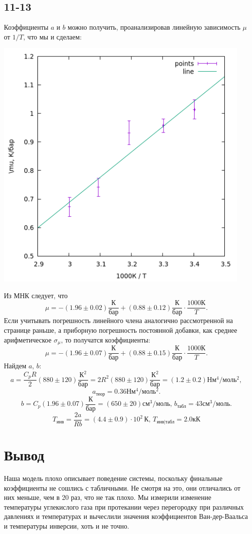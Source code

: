 \subsection*{11-13}
Коэффициенты $a$ и $b$ можно получить, проанализировав линейную зависимость $\mu$ от $1/T$, что мы и сделаем:
\begin{center}
\includegraphics[width=0.95\textwidth]{plot0.png}
\end{center}
Из МНК следует, что
$$\mu = -(1.96\pm0.02)\frac{\text{К}}{\text{бар}} + (0.88\pm0.12)\frac{\text{К}}{\text{бар}}\cdot\frac{1000\text{К}}{T}.$$
Если учитывать погрешность линейного члена аналогично рассмотренной на странице раньше, а приборную погрешность постоянной добавки, как среднее арифметическое $\sigma_\mu$, то получатся коэффициенты:
$$\mu = -(1.96\pm0.07)\frac{\text{К}}{\text{бар}} + (0.88\pm0.15)\frac{\text{К}}{\text{бар}}\cdot\frac{1000\text{К}}{T}.$$
Найдем $a$, $b$:
$$a = \frac{C_pR}{2}(880\pm120)\frac{\text{К}^2}{\text{бар}}=2R^2(880\pm120)\frac{\text{К}^2}{\text{бар}} = (1.2\pm0.2) \text{Н}\text{м}^4/\text{моль}^2,$$
$$a_\text{теор} = 0.36 \text{Н}\text{м}^4/\text{моль}^2.$$
$$b = C_p(1.96\pm0.07)\frac{\text{К}}{\text{бар}}=(650\pm20)\text{см}^3/\text{моль},\,b_\text{табл} = 43\text{см}^3/\text{моль}.$$
$$T_\text{инв}=\frac{2a}{Rb}=(4.4\pm0.9)\cdot 10^2\,\text{К},\,T_\text{инв|табл}=2.0\text{кК}$$
\section*{Вывод}
Наша модель плохо описывает поведение системы, поскольку финальные коэффициенты не сошлись с табличными. Не смотря на это, они отличались от них меньше, чем в 20 раз, что не так плохо. Мы измерили изменение температуры углекислого газа при протекании через перегородку при различных давлениях и температурах и вычеслили значения коэффициентов Ван-дер-Ваальса и температуры инверсии, хоть и не точно.










